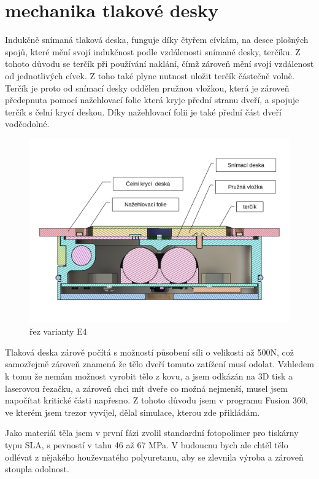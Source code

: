 \section*{mechanika tlakové desky}

Indukčně snímaná tlaková deska, funguje díky čtyřem cívkám, na desce plošných spojů, které mění svojí indukčnost podle vzdálenosti snímané desky, terčíku.
Z tohoto důvodu se terčík při používání naklání, čímž zároveň mění svojí vzdálenost od jednotlivých cívek. Z toho také plyne nutnost uložit terčík
částečně volně. Terčík je proto od snímací desky oddělen pružnou vložkou, která je zároveň předepnuta pomocí nažehlovací folie která kryje přední 
stranu dveří, a spojuje terčík s čelní krycí deskou. Díky nažehlovací folii je také přední část dveří voděodolné.

\begin{figure}[htbp]
    \centering
    \includegraphics[width=\textwidth]{kapitoly/obrazky/E4/machanika_tlakove_desky/rez_po_ose.pdf}
    \caption{řez varianty E4}
    \label{fig:E4-rez}
\end{figure}

Tlaková deska zárově počítá s možností působení síli o velikosti až 500N, což samozřejmě zároveň znamená že tělo dveří tomuto zatížení musí odolat.
Vzhledem k tomu že nemám možnost vyrobit tělo z kovu, a jsem odkázán na 3D tisk a laserovou řezačku, a zároveň chci mít dveře co možná nejmenší,
musel jsem napočítat kritické části napřesno. Z tohoto důvodu jsem v programu Fusion 360, ve kterém jsem trezor vyvíjel,
dělal simulace, kterou zde přikládám. 

Jako materiál těla jsem v první fázi zvolil standardní fotopolimer pro tiskárny typu SLA, s pevností v tahu 46 až 67 MPa.
V budoucnu bych ale chtěl tělo odlévat z nějakého houževnatého polyuretanu, aby se zlevnila výroba a zároveň stoupla odolnost.

